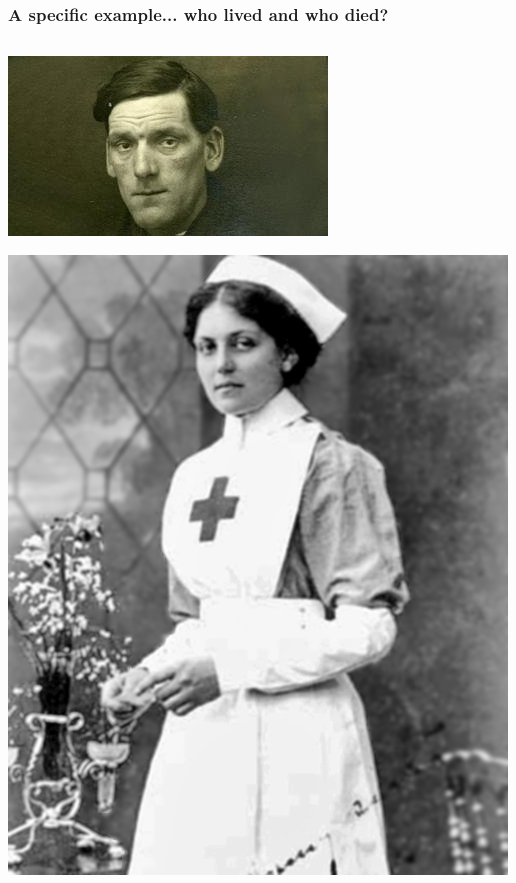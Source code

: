\documentclass[aspectratio=169]{beamer}
\begin{document}
\begin{frame}
\frametitle{A specific example... who lived and who died?}


\begin{columns}

\begin{column}{0.5\textwidth}

\begin{center}
\includegraphics[scale=0.55]{_59403930_john_priest_landscape.jpg}
\end{center}

\begin{center}
\includegraphics[scale=0.18]{Violet_jessop_titanic.jpg}
\end{center}


\end{column}
\end{columns}
\end{frame}
\end{document}
